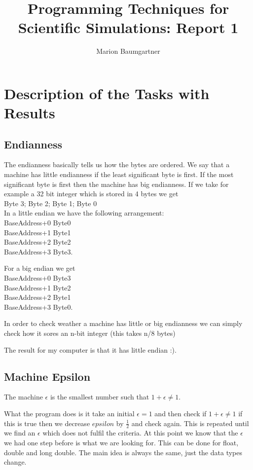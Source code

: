 \documentclass[a4paper,10pt]{article}
\title{Programming Techniques for Scientific Simulations: Report 1}
\author{Marion Baumgartner}
\begin{document}
\maketitle

\section{Description of the Tasks with Results}
\subsection{Endianness}
The endianness basically tells us how the bytes are ordered. We say that a machine has little endianness if the least significant byte is first. If the most significant byte is first then the machine has big endianness. If we take for example a 32 bit integer which is stored in 4 bytes we get \\
Byte 3; Byte 2; Byte 1; Byte 0\\


In a little endian we have the following arrangement:\\
BaseAddress+0 Byte0\\
BaseAddress+1 Byte1\\
BaseAddress+2 Byte2\\
BaseAddress+3 Byte3.


For a big endian we get\\
BaseAddress+0 Byte3\\
BaseAddress+1 Byte2\\
BaseAddress+2 Byte1\\
BaseAddress+3 Byte0.


In order to check weather a machine has little or big endianness we can simply check how it sores an n-bit integer (this takes n/8 bytes)

The result for my computer is that it has little endian :).

\subsection{Machine Epsilon}
The machine $\epsilon$ is the smallest number such that $1+\epsilon \neq 1$.


What the program does is it take an initial $\epsilon=1$ and then check if $1+\epsilon \neq 1$ if this is true then we decrease $epsilon$ by $\frac{1}{2}$ and check again. This is repeated until we find an $\epsilon$ which does not fulfil the criteria. At this point we know that the $\epsilon$ we had one step before is what we are looking for. This can be done for float, double and long double. The main idea is always the same, just the data types change.
\end{document}
